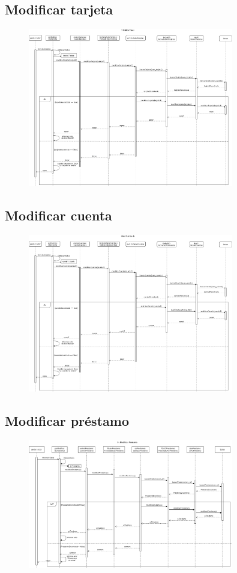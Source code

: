 \documentclass[12pt]{article}
\begin{document}
\subsection{Modificar tarjeta}
\begin{figure}[H]
    \centering
    \includegraphics[width=0.8\textwidth]{7-Gestor_modifica_tarjeta.png}
\end{figure}
\subsection{Modificar cuenta}
\begin{figure}[H]
    \centering
    \includegraphics[width=0.8\textwidth]{8-Gestor_modifica_cuenta.png}
\end{figure}
\subsection{Modificar préstamo}
\begin{figure}[H]
    \centering
    \includegraphics[width=0.8\textwidth]{9._GestorModificaPrestamo.png}
\end{figure}
\end{document}
